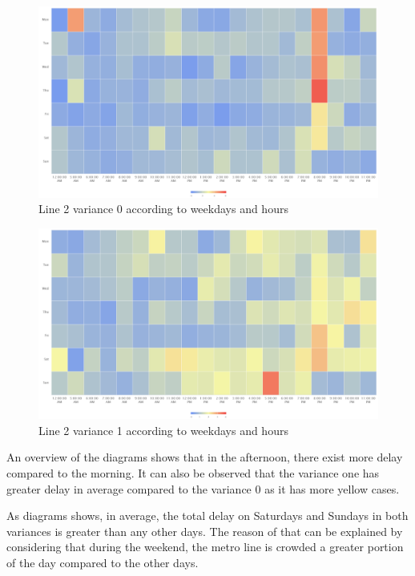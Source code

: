 \documentclass{article}
\begin{document}
 \begin{figure}[H]
    \centering
    \includegraphics[width=\textwidth]{images/delay_2_day_hour_0.png} 
    \caption{Line 2 variance 0 according to weekdays and hours}
\end{figure}

 \begin{figure}[H]
    \centering
    \includegraphics[width=\textwidth]{images/delay_2_day_hour_1.png} 
    \caption{Line 2 variance 1 according to weekdays and hours}
\end{figure}

An overview of the diagrams shows that in the afternoon, there exist more delay compared to the morning. It can also be observed that the variance one has greater delay in average compared to the variance 0 as it has more yellow cases.

As diagrams shows, in average, the total delay on Saturdays and Sundays in both variances is greater than any other days. The reason of that can be explained by considering that during the weekend, the metro line is crowded a greater portion of the day compared to the other days.
 
\end{document}
